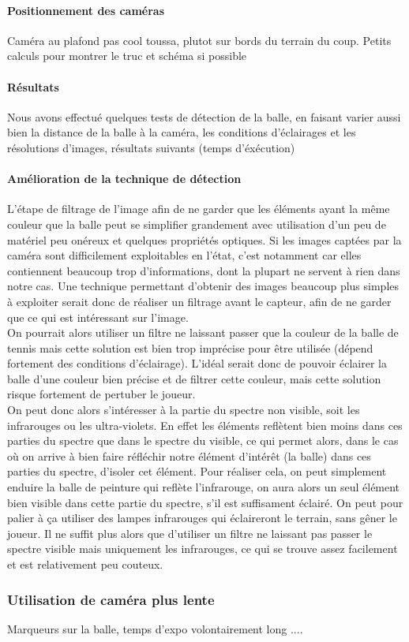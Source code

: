 \paragraph{Positionnement des caméras\\}

Caméra au plafond pas cool toussa, plutot sur bords du terrain du coup. Petits calculs pour montrer le truc et schéma si possible


\paragraph{Résultats\\}

Nous avons effectué quelques tests de détection de la balle, en faisant varier aussi bien la distance de la balle à la caméra, les conditions d'éclairages et les résolutions d'images, résultats suivants (temps d'éxécution)


\paragraph{Amélioration de la technique de détection\\}

L'étape de filtrage de l'image afin de ne garder que les éléments ayant la même couleur que la balle peut se simplifier grandement avec utilisation d'un peu de matériel peu onéreux et quelques propriétés optiques. Si les images captées par la caméra sont difficilement exploitables en l'état, c'est notamment car elles contiennent beaucoup trop d'informations, dont la plupart ne servent à rien dans notre cas. Une technique permettant d'obtenir des images beaucoup plus simples à exploiter serait donc de réaliser un filtrage avant le capteur, afin de ne garder que ce qui est intéressant sur l'image. \\

On pourrait alors utiliser un filtre ne laissant passer que la couleur de la balle de tennis mais cette solution est bien trop imprécise pour être utilisée (dépend fortement des conditions d'éclairage). L'idéal serait donc de pouvoir éclairer la balle d'une couleur bien précise et de filtrer cette couleur, mais cette solution risque fortement de pertuber le joueur. \\

On peut donc alors s'intéresser à la partie du spectre non visible, soit les infrarouges ou les ultra-violets. En effet les éléments reflètent bien moins dans ces parties du spectre que dans le spectre du visible, ce qui permet alors, dans le cas où on arrive à bien faire réfléchir notre élément d'intérêt (la balle) dans ces parties du spectre, d'isoler cet élément. Pour réaliser cela, on peut simplement enduire la balle de peinture qui reflète l'infrarouge, on aura alors un seul élément bien visible dans cette partie du spectre, s'il est suffisament éclairé. On peut pour palier à ça utiliser des lampes infrarouges qui éclaireront le terrain, sans gêner le joueur. Il ne suffit plus alors que d'utiliser un filtre ne laissant pas passer le spectre visible mais uniquement les infrarouges, ce qui se trouve assez facilement et est relativement peu couteux.


\subsubsection{Utilisation de caméra plus lente}

Marqueurs sur la balle, temps d'expo volontairement long .... 

